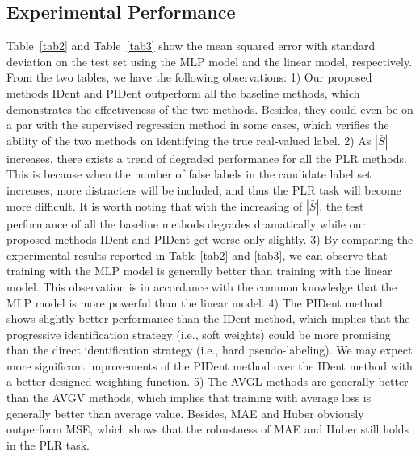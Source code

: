 \documentclass[letterpaper]{article} %
\begin{document}
\subsection{Experimental Performance}
Table~\ref{tab2} and Table~\ref{tab3} show the mean squared error with standard deviation on the test set using the MLP model and the linear model, respectively. From the two tables, we have the following observations:
1) Our proposed methods IDent and PIDent outperform all the baseline methods, which demonstrates the effectiveness of the two methods. Besides, they could even be on a par with the supervised regression method in some cases, which verifies the ability of the two methods on identifying the true real-valued label.
2) As $|\bar{S}|$ increases, there exists a trend of degraded performance for all the PLR methods. This is because when the number of false labels in the candidate label set increases, more distracters will be included, and thus the PLR task will become more difficult. It is worth noting that with the increasing of $|\bar{S}|$, the test performance of all the baseline methods degrades dramatically while our proposed methods IDent and PIDent get worse only slightly.
3) By comparing the experimental results reported in Table \ref{tab2} and \ref{tab3}, we can observe that training with the MLP model is generally better than training with the linear model. This observation is in accordance with the common knowledge that the MLP model is more powerful than the linear model.
4) The PIDent method shows slightly better performance than the IDent method, which implies that the progressive identification strategy (i.e., soft weights) could be more promising than the direct identification strategy (i.e., hard pseudo-labeling). We may expect more significant improvements of the PIDent method over the IDent method with a better designed weighting function.
5) The AVGL methods are generally better than the AVGV methods, which implies that training with average loss is generally better than average value. Besides, MAE and Huber obviously outperform MSE, which shows that the robustness of MAE and Huber still holds in the PLR task.
\end{document}
